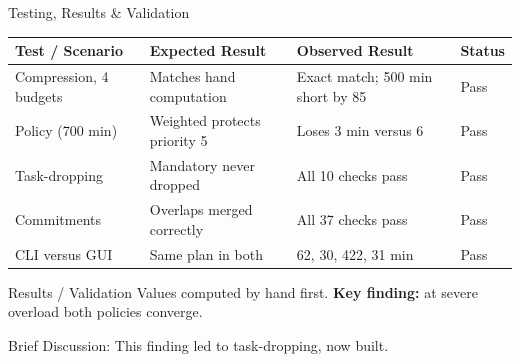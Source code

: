 \documentclass[aspectratio=169,11pt]{beamer}
\newcommand{\smallnote}[1]{%
\vspace{0.08cm}
{\scriptsize\color{GEUGrey}#1}
}
\begin{document}
\begin{frame}{Testing, Results \& Validation}

\scriptsize

\begin{center}

\renewcommand{\arraystretch}{1.3}

\begin{tabularx}{.96\textwidth}
{@{}p{2.6cm}X X p{1.0cm}@{}}

\toprule
Test / Scenario &
Expected Result &
Observed Result &
Status\\
\midrule

Compression, 4 budgets &
Matches hand computation &
Exact match; 500 min short by 85 &
Pass\\

Policy (700 min) &
Weighted protects priority 5 &
Loses 3 min versus 6 &
Pass\\

Task-dropping &
Mandatory never dropped &
All 10 checks pass &
Pass\\

Commitments &
Overlaps merged correctly &
All 37 checks pass &
Pass\\

CLI versus GUI &
Same plan in both &
62, 30, 422, 31 min &
Pass\\

\bottomrule

\end{tabularx}

\end{center}

\vspace{2mm}

\begin{block}{Results / Validation}
\scriptsize
Values computed by hand first. \textbf{Key finding:} at severe overload both policies converge.
\end{block}

\smallnote{
Brief Discussion: This finding led to task-dropping, now built.
}

\end{frame}
\end{document}
